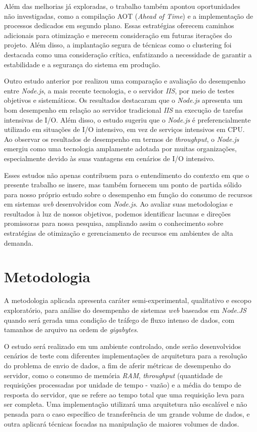 \documentclass[12pt]{article}
\begin{document}
Além das melhorias já exploradas, o trabalho também apontou oportunidades não 
investigadas, como a compilação AOT (\textit{Ahead of Time}) e a implementação de processos dedicados em segundo 
plano. Essas estratégias oferecem caminhos adicionais para otimização e merecem consideração em futuras 
iterações do projeto. Além disso, a implantação segura de técnicas como o clustering foi destacada como uma 
consideração crítica, enfatizando a necessidade de garantir a estabilidade e a segurança do sistema em produção.

Outro estudo anterior por \cite{NODEJVERSUSIIS} realizou uma comparação e avaliação do desempenho entre \textit{Node.js}, a mais recente 
tecnologia, e o servidor \textit{IIS}, por meio de testes objetivos e sistemáticos. Os resultados 
destacaram que o \textit{Node.js} apresenta um bom desempenho em relação ao servidor tradicional \textit{IIS} na 
execução de tarefas intensivas de I/O. Além disso, o estudo sugeriu que o \textit{Node.js} é preferencialmente utilizado 
em situações de I/O intensivo, em vez de serviços intensivos em CPU. Ao observar os resultados de desempenho em 
termos de \textit{throughput}, o \textit{Node.js} emergiu como uma tecnologia amplamente adotada por muitas organizações, 
especialmente devido às suas vantagens em cenários de I/O intensivo.

Esses estudos não apenas contribuem para o entendimento do contexto em que o presente trabalho se insere, 
mas também fornecem um ponto de partida sólido para nosso próprio estudo sobre o desempenho em função 
do consumo de recursos em sistemas \textit{web} desenvolvidos com \textit{Node.js}. Ao avaliar suas metodologias e 
resultados à luz de nossos objetivos, podemos identificar lacunas e direções promissoras para nossa 
pesquisa, ampliando assim o conhecimento sobre estratégias de otimização e gerenciamento de recursos 
em ambientes de alta demanda.


\section{Metodologia}

A metodologia aplicada apresenta caráter semi-experimental, qualitativo
e escopo exploratório, para análise do desempenho de sistemas \textit{web} baseados em \textit{Node.JS} 
quando será gerada uma condição de tráfego de fluxo intenso de dados,
com tamanhos de arquivo na ordem de \textit{gigabytes}.

O estudo será realizado em um ambiente controlado, onde serão desenvolvidos cenários de teste com diferentes 
implementações de arquitetura para a resolução do problema de envio de dados, a fim de aferir métricas de desempenho do servidor, 
como o consumo de memória \textit{RAM}, \textit{throughput} (quantidade de requisições processadas por unidade 
de tempo - vazão) e a média do tempo de resposta do servidor, que se refere ao tempo total que uma requisição leva
para ser completa. Uma implementação utilizará uma arquitetura não escalável e não 
pensada para o caso específico de transferência de um grande volume de dados, e outra aplicará técnicas focadas na 
manipulação de maiores volumes de dados.
\end{document}

